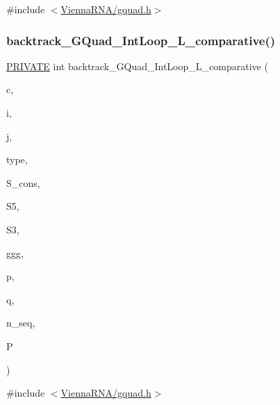 {\ttfamily \#include $<$\mbox{\hyperlink{gquad_8h}{Vienna\+R\+N\+A/gquad.\+h}}$>$}

\mbox{\label{group__gquads_ga72bb580a045d7319effc78c1ae3a0e7b}} 
\subsubsection{\texorpdfstring{backtrack\+\_\+\+G\+Quad\+\_\+\+Int\+Loop\+\_\+\+L\+\_\+comparative()}{backtrack\_GQuad\_IntLoop\_L\_comparative()}}
{\footnotesize\ttfamily \mbox{\hyperlink{group__utils_ga5e151c615eda34903514212f05a5ccf8}{P\+R\+I\+V\+A\+TE}} int backtrack\+\_\+\+G\+Quad\+\_\+\+Int\+Loop\+\_\+\+L\+\_\+comparative (\begin{DoxyParamCaption}\item[{int}]{c,  }\item[{int}]{i,  }\item[{int}]{j,  }\item[{unsigned int $\ast$}]{type,  }\item[{short $\ast$}]{S\+\_\+cons,  }\item[{short $\ast$$\ast$}]{S5,  }\item[{short $\ast$$\ast$}]{S3,  }\item[{int $\ast$$\ast$}]{ggg,  }\item[{int $\ast$}]{p,  }\item[{int $\ast$}]{q,  }\item[{int}]{n\+\_\+seq,  }\item[{\mbox{\hyperlink{group__energy__parameters_ga8a69ca7d787e4fd6079914f5343a1f35}{vrna\+\_\+param\+\_\+t}} $\ast$}]{P }\end{DoxyParamCaption})}



{\ttfamily \#include $<$\mbox{\hyperlink{gquad_8h}{Vienna\+R\+N\+A/gquad.\+h}}$>$}

\mbox{\label{group__gquads_gab0120fbc587102aee41a22d53c8ba6d3}} 
